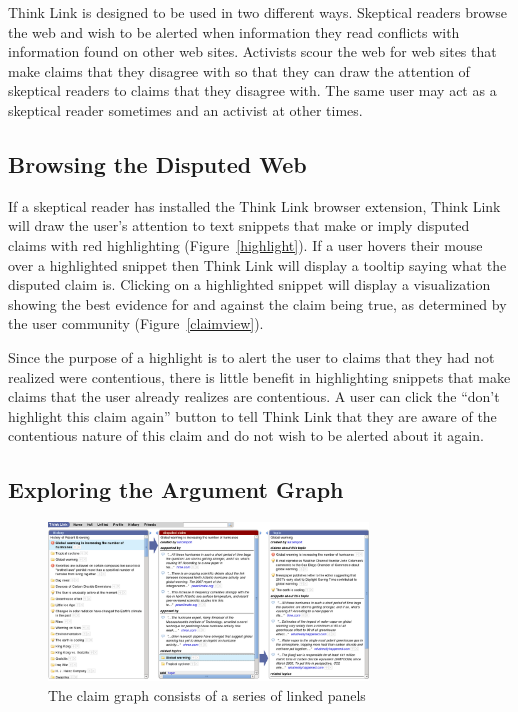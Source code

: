 \documentclass{chi2009}
\newcommand{\todo}[1]{}
\begin{document}
Think Link is designed to be used in two different ways. 
Skeptical readers browse the web and wish to be alerted when information they read conflicts with information found on other web sites.  %
Activists scour the web for web sites that make claims that they disagree with so that they can draw the attention of skeptical readers to claims that they disagree with.  %
The same user may act as a skeptical reader sometimes and an activist at other times.  %

\subsection{Browsing the Disputed Web}

If a skeptical reader has installed the Think Link browser extension, Think Link will draw the user's attention to text snippets that make or imply disputed claims with red highlighting (Figure~\ref{highlight}).  %
If a user hovers their mouse over a highlighted snippet then Think Link will display a tooltip saying what the disputed claim is. Clicking on a highlighted snippet will display a visualization showing the best evidence for and against the claim being true, as determined by the user community (Figure~\ref{claimview}).  %

Since the purpose of a highlight is to alert the user to claims that they had not realized were contentious, there is little benefit in highlighting snippets that make claims that the user already realizes are contentious. A user can click the ``don't highlight this claim again'' button to tell Think Link that they are aware of the contentious nature of this claim and do not wish to be alerted about it again.

\todo{ignore button}
\todo{talk about the margin?}

\subsection{Exploring the Argument Graph}

\begin{figure}[tb]
	\begin{center}
	\includegraphics[width=8.5cm]{../screenshots/v2_panels.png}
	\caption{The claim graph consists of a series of linked panels}
	\label{panels}
	\end{center}
\end{figure}
\end{document}
